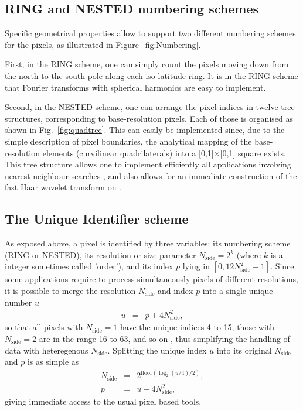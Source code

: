 \documentclass[12pt,twoside]{article}
\makeatletter
\newcommand{\myhtmlimage}[1]{ }
\newcommand{\myequal}{=}
\renewcommand{\myequal}{=} %
\newcommand{\nop}[1]{\Hy@raisedlink{\hypertarget{#1}{}}}
\newcommand{\mytarget}[1]{\nop{#1}}%
\newcommand{\mytarget}[1]{\label{#1}}
\newcommand{\nside}{N_{\mathrm{side}}}
\makeatother
\begin{document}
\subsection{RING and NESTED numbering schemes}
Specific geometrical properties allow \healpix to support two different
numbering schemes for the pixels, as illustrated in Figure~\ref{fig:Numbering}. 

First, in the RING scheme, 
one can simply count the pixels moving down from the north 
to the south pole along each
iso-latitude ring. It is in the RING scheme that Fourier transforms 
with spherical harmonics
are easy to implement.

Second, in the NESTED scheme, one can arrange the pixel indices 
in  twelve tree structures, corresponding to base-resolution pixels.
Each of those is organised as shown in Fig.~\ref{fig:quadtree}. %
This can easily be implemented
since, due to the simple 
description of pixel boundaries, the analytical mapping of the \healpix
base-resolution elements (curvilinear
quadrilaterals) into a [0,1]$\times$[0,1] square exists.
This tree structure allows one to implement efficiently all
applications involving  nearest-neighbour searches
\citep{whg},
and also allows for an immediate
construction of the fast Haar wavelet transform on \healpixns. 

\subsection{The Unique Identifier scheme}
\label{intro:unique}
As exposed above, a \healpix pixel is identified by three variables:
its numbering scheme (RING or NESTED), 
its resolution or size parameter $\nside = 2^k$ (where $k$ is a integer sometimes called 'order'),
and its index $p$ lying in $[0, 12\nside^2-1]$.
Since some applications require to process simultaneously pixels of different resolutions, it is possible
to merge the resolution $\nside$ and index $p$ into a single unique number $u$
\begin{eqnarray}
	u &=& p + 4 \nside^2, \myhtmlimage{} \label{eq:nest2uniq}
\end{eqnarray}
so that all pixels with $\nside=1$ have the unique indices 4 to 15, 
those with $\nside=2$ are in the range 16 to 63, and so on \citep{rh15}, 
thus simplifying the handling of data with heteregenous $\nside$.
Splitting the unique index $u$ into its original $\nside$ and $p$ is as simple as
\begin{eqnarray}
	\nside &=& 2^{\mathrm{floor}\left( \log_2(u/4)/2 \right)}, \myhtmlimage{} \label{eq:ring2nest_a}\\
	     p &=& u - 4 \nside^2, \myhtmlimage{} \label{eq:ring2nest_b}
\end{eqnarray}
giving immediate access to the usual pixel based tools.
\end{document}
